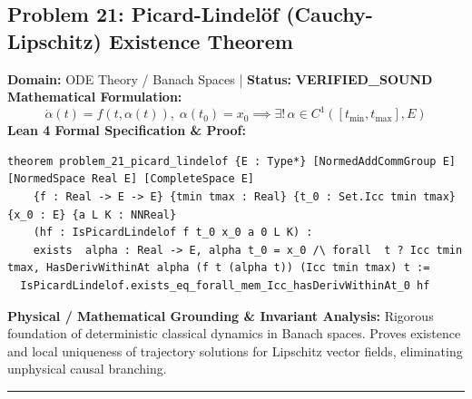 \documentclass[10pt,a4paper]{article}
\begin{document}
\subsection*{Problem 21: Picard-Lindelöf (Cauchy-Lipschitz) Existence Theorem}
\textbf{Domain:} ODE Theory / Banach Spaces \quad | \quad \textbf{Status:} \textcolor{green!70!black}{\textbf{VERIFIED\_SOUND}}\\
\textbf{Mathematical Formulation:}
\begin{equation*}
  \dot{\alpha}(t) = f(t, \alpha(t)), \; \alpha(t_0) = x_0 \implies \exists!\, \alpha \in C^1([t_{\min}, t_{\max}], E)
\end{equation*}
\textbf{Lean 4 Formal Specification \& Proof:}
\begin{lstlisting}
theorem problem_21_picard_lindelof {E : Type*} [NormedAddCommGroup E] [NormedSpace Real E] [CompleteSpace E]
    {f : Real -> E -> E} {tmin tmax : Real} {t_0 : Set.Icc tmin tmax} {x_0 : E} {a L K : NNReal}
    (hf : IsPicardLindelof f t_0 x_0 a 0 L K) :
    exists  alpha : Real -> E, alpha t_0 = x_0 /\ forall  t ? Icc tmin tmax, HasDerivWithinAt alpha (f t (alpha t)) (Icc tmin tmax) t :=
  IsPicardLindelof.exists_eq_forall_mem_Icc_hasDerivWithinAt_0 hf
\end{lstlisting}
\textbf{Physical / Mathematical Grounding \& Invariant Analysis:}
Rigorous foundation of deterministic classical dynamics in Banach spaces. Proves existence and local uniqueness of trajectory solutions for Lipschitz vector fields, eliminating unphysical causal branching.
\vspace{0.8em}\hrule\vspace{0.8em}
\end{document}
